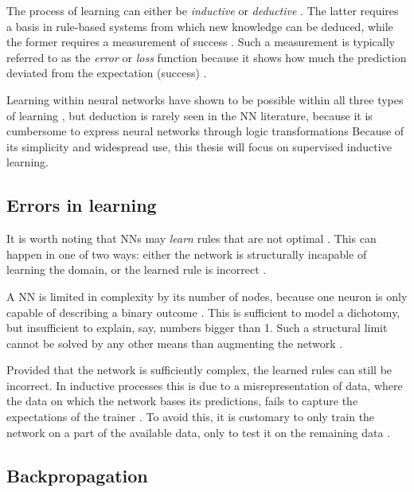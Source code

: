 \documentclass[report.tex]{subfiles}
\begin{document}
The process of learning can either be \textit{inductive}
or \textit{deductive}  \cite[p. 704]{Russel2007}.
The latter requires a basis in rule-based systems from which new knowledge can
be deduced, while the former requires a measurement of success \cite[p. 705]{Russel2007}.
Such a measurement is typically referred to as the \textit{error} or \textit{loss}
function
because it shows how much the prediction deviated from the expectation (success)
\cite{Russel2007}.

Learning within neural networks have shown to be possible within all three
types of learning \cite{Schmidhubner2014, Russel2007}, but deduction is rarely
seen in the \gls{NN} literature, because it is cumbersome to express neural
networks through logic transformations 
Because of its simplicity and widespread use, this thesis will focus on supervised
inductive learning.

\subsection{Errors in learning}
It is worth noting that \gls{NN}s may \textit{learn} 
rules  that are not optimal \cite{Russel2007}.
This can happen in one of two ways: either the
network is structurally incapable of learning the domain, 
or the learned rule is incorrect \cite{Russel2007, Eliasmith2015}.

A \gls{NN} is limited in complexity by its number of nodes,
because one neuron is only capable of describing a binary
outcome \cite{Dayan2001, Russel2007}.
This is sufficient to model a dichotomy, but insufficient
to explain, say, numbers bigger than 1.
Such a structural limit cannot be solved by any other means
than augmenting the network \cite{Russel2007}.

Provided that the network is sufficiently complex, the 
learned rules can still be incorrect.
In inductive processes this is due to a misrepresentation
of data, where the data on which the network bases its
predictions, fails to capture the expectations of the
trainer \cite{Russel2007}.
To avoid this, it is customary to only train the network
on a part of the available data, only to test it on 
the remaining data \cite{Russel2007, Schmidhuber2014}.

\subsection{Backpropagation}
\end{document}
